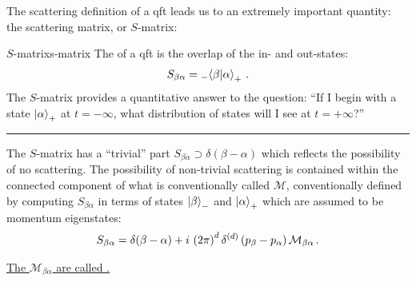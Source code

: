 

The scattering definition of a \gls{qft} leads us to an extremely important quantity:
%
the scattering matrix, or \(S\)-matrix:

\begin{definitionbox}{\(S\)-matrix}{s-matrix}
    The  of a \gls{qft} is the overlap of the in- and out-states:
    \begin{align}
        S_{\beta \alpha}
        =
        {}_-\!\braket{\beta}{\alpha}_+
        \,.
    \end{align}
    The \(S\)-matrix provides a quantitative answer to the question:
    ``If I begin with a state \(\ket{\alpha}_+\) at \(t = -\infty\), what distribution of states will I see at \(t = +\infty\)?''

    \vspace{7pt}
    \hrule
    \vspace{7pt}

    The \(S\)-matrix has a ``trivial'' part \(S_{\beta\alpha} \supset \delta(\beta - \alpha)\) which reflects the possibility of no scattering.
    The possibility of non-trivial scattering is contained within the connected component of what is conventionally called \(\mathcal{M}\), conventionally defined by computing \(S_{\beta\alpha}\) in terms of states \(\ket{\beta}_-\) and \(\ket{\alpha}_+\) which are assumed to be momentum eigenstates:
    \begin{align}
        S_{\beta \alpha}
        =
        \delta(\beta - \alpha)
        +
        i\,
        \left(2\pi\right)^d \delta^{(d)}\left(p_\beta - p_\alpha\right)
        \mathcal{M}_{\beta\alpha}
        \,.
    \end{align}

    \underline{The \(\mathcal{M}_{\beta\alpha}\) are called .}
\end{definitionbox}


